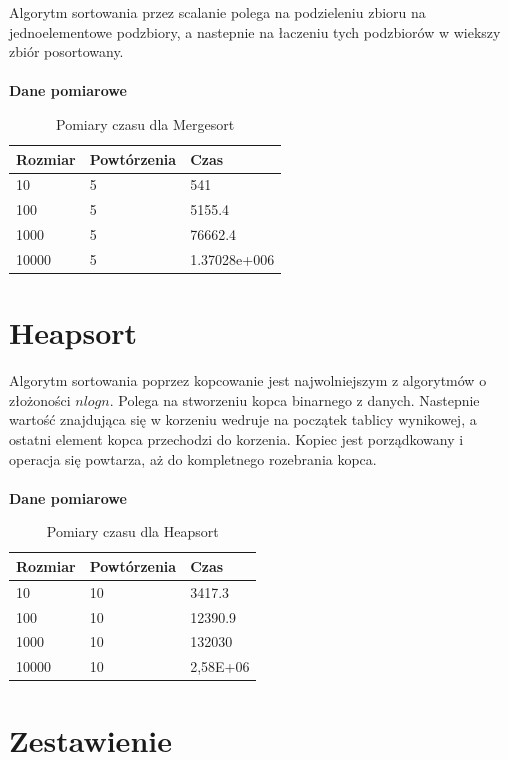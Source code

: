 \documentclass[12pt,oneside]{mwbk}
\begin{document}
	\indent Algorytm sortowania przez scalanie polega na podzieleniu zbioru na jednoelementowe podzbiory, a nastepnie na łaczeniu tych podzbiorów w wiekszy zbiór posortowany. \\
	\\
	\textbf{Dane pomiarowe}
	\begin{table}[!h]
	\centering
	\begin{tabular}{| l | l | l |}
	\hline
	Rozmiar & Powtórzenia & Czas         \\ \hline
	10&5&541\\ \hline
	100&5&5155.4\\ \hline
	1000&5&76662.4\\ \hline
	10000&5&1.37028e+006\\ \hline
	\end{tabular}
	\caption{Pomiary czasu dla Mergesort}
	\end{table}

	
\section {Heapsort}

	\indent Algorytm sortowania poprzez kopcowanie jest najwolniejszym z algorytmów o złożoności $ nlogn $. Polega na stworzeniu kopca binarnego z danych. Nastepnie wartość znajdująca się w korzeniu wedruje na początek tablicy wynikowej, a ostatni element kopca przechodzi do korzenia. Kopiec jest porządkowany i operacja się powtarza, aż do kompletnego rozebrania kopca.\\
	\\
	\textbf{Dane pomiarowe}
	
	
	\begin{table}[h]
	\centering
	\begin{tabular}{| l | l | l |}
	\hline
	Rozmiar & Powtórzenia & Czas        \\ \hline
	10&10&3417.3\\ \hline
	100&10&12390.9\\ \hline
	1000&10&132030\\ \hline
	10000&10&2,58E+06\\ \hline
	\end{tabular}
	\caption{Pomiary czasu dla Heapsort}
	\end{table}

	
\section{Zestawienie}
\end{document}
